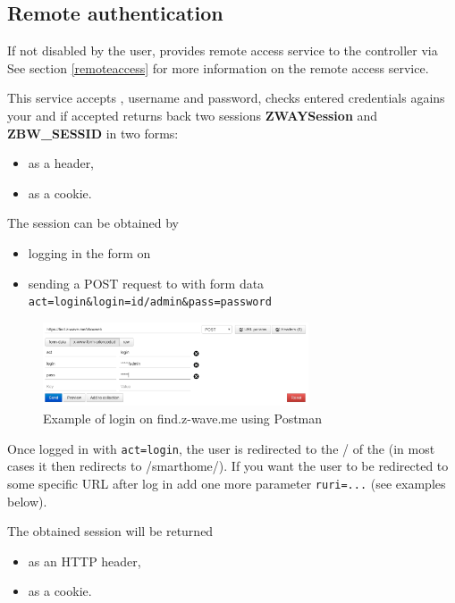 \subsection{Remote authentication}
\label{cap:authentication_remote}

If not disabled by the user, \zway provides remote access service to the controller via 
See section \ref{remoteaccess} for more information on the \zway remote access service.

This service accepts \zwaydeviceid, username and password, checks entered
credentials agains your \zway and if accepted returns back two sessions \textbf{ZWAYSession}
and \textbf{ZBW\_SESSID} in two forms:
\begin{itemize}
\item as a header,
\item as a cookie.
\end{itemize}

The session can be obtained by
\begin{itemize}
\item logging in the form on 
\item sending a POST request to  with form data \texttt{act=login\&login=id/admin\&pass=password}
\end{itemize}

\begin{figure}
\begin{center}
\includegraphics[width=0.7\textwidth]{pngs/cap13/find-login-postman.png}
\caption{Example of login on find.z-wave.me using Postman}
\label{authenticatioln_remote_find}
\end{center}
\end{figure}

Once logged in with \texttt{act=login}, the user is redirected to the / of the \zway (in most cases it then redirects to /smarthome/).
If you want the user to be redirected to some specific URL after log in add one more parameter \texttt{ruri=...} (see examples below).

The obtained session will be returned
\begin{itemize}
\item as an HTTP header,
\item as a cookie.
\end{itemize}


